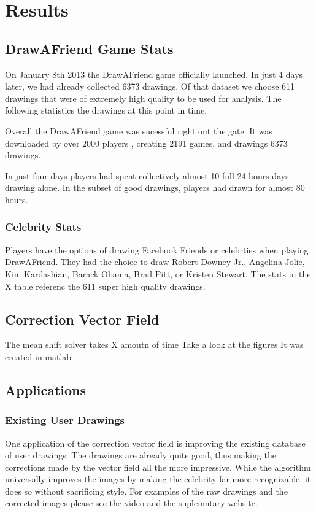 \section{Results}
\subsection{DrawAFriend Game Stats}
On January 8th 2013 the DrawAFriend game officially launched. In just 4 days later, we had already collected 6373 drawings. Of that dataset we choose 611 drawings that were of extremely high quality to be used for analysis.  The following statistics the drawings at this point in time. 

Overall the DrawAFriend game was sucessful right out the gate. It was downloaded by over 2000 players , creating 2191 games, and drawings 6373 drawings. 

In just four days players had spent collectively almost 10 full 24 hours days drawing alone. In the subset of good drawings, players had drawn for almost 80 hours.

\subsubsection{Celebrity Stats}
Players have the options of drawing Facebook Friends or celebrties when playing DrawAFriend. They had the choice to draw Robert Downey Jr., Angelina Jolie, Kim Kardashian, Barack Obama, Brad Pitt, or Kristen Stewart. The stats in the X table referenc the 611 super high quality drawings.


\subsection {Correction Vector Field}
The mean shift solver takes X amoutn of time 
Take a look at the figures
It was created in matlab

\subsection {Applications}
\subsubsection{Existing User Drawings}
One application of the correction vector field is improving the existing database of user drawings. The drawings are already quite good, thus making the corrections made by the vector field all the more impressive.  While the algorithm universally improves the images by making the celebrity far more recognizable, it does so without sacrificing style. For examples of the raw drawings and the corrected images please see the video and the suplemntary website.

